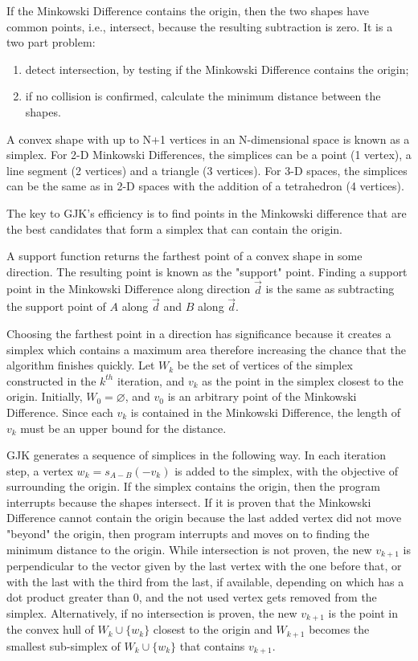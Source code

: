 \par If the Minkowski Difference contains the origin, then the two shapes have common points, i.e., intersect, because the resulting subtraction is zero. It is a two part problem: 
\begin{enumerate}
    \item detect intersection, by testing if the Minkowski Difference contains the origin;
    \item if no collision is confirmed, calculate the minimum distance between the shapes.
\end{enumerate}
\par A convex shape with up to N+1 vertices in an N-dimensional space is known as a simplex. For 2-D Minkowski Differences, the simplices can be a point (1 vertex), a line segment (2 vertices) and a triangle (3 vertices). For 3-D spaces, the simplices can be the same as in 2-D spaces with the addition of a tetrahedron (4 vertices).
\par The key to \ac{GJK}'s efficiency is to find points in the Minkowski difference that are the best candidates that form a simplex that can contain the origin. 
\par A support function returns the farthest point of a convex shape in some direction. The resulting point is known as the "support" point. Finding a support point in the Minkowski Difference along direction $\overrightarrow{d}$ is the same as subtracting the support point of $A$ along $\overrightarrow{d}$ and $B$ along $\overrightarrow{d}$. 
\par Choosing the farthest point in a direction has significance because it creates a simplex which contains a maximum area therefore increasing the chance that the algorithm finishes quickly. Let $W_k$ be the set of vertices of the simplex constructed in the $k^{th}$ iteration, and $v_k$ as the point in the simplex closest to the origin. Initially, $W_0=\varnothing$, and $v_0$ is an arbitrary point of the Minkowski Difference. Since each $v_k$ is contained in the Minkowski Difference, the length of $v_k$ must be an upper bound for the distance.
\par \ac{GJK} generates a sequence of simplices in the following way. In each iteration step, a vertex $w_k = s_{A-B}(-v_k)$ is added to the simplex, with the objective of surrounding the origin. If the simplex contains the origin, then the program interrupts because the shapes intersect. If it is proven that the Minkowski Difference cannot contain the origin because the last added vertex did not move "beyond" the origin, then program interrupts and moves on to finding the minimum distance to the origin. While intersection is not proven, the new $v_{k+1}$ is perpendicular to the vector given by the last vertex with the one before that, or with the last with the third from the last, if available, depending on which has a dot product greater than 0, and the not used vertex gets removed from the simplex. Alternatively, if no intersection is proven, the new $v_{k+1}$ is the point in the convex hull of $W_k\cup \{w_k\}$ closest to the origin and $W_{k+1}$ becomes the smallest sub-simplex of $W_k\cup \{w_k\}$ that contains $v_{k+1}$.


